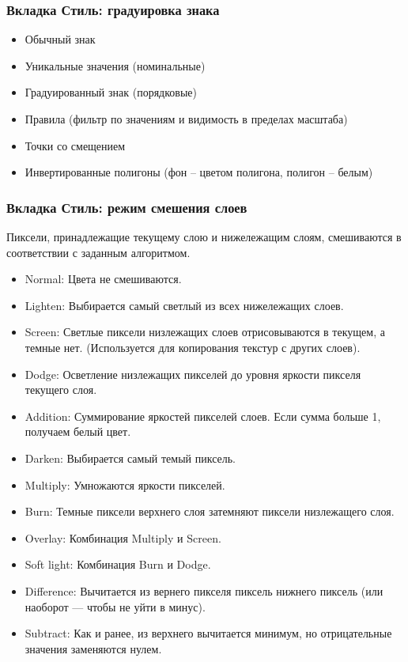 \begin{frame}[allowframebreaks]
    \frametitle{Вкладка Стиль: градуировка знака}
    \begin{itemize}
        \item Обычный знак
        \item Уникальные значения (номинальные)
        \item Градуированный знак (порядковые)
        \item Правила (фильтр по значениям и видимость в пределах масштаба)
        \item Точки со смещением
        \item Инвертированные полигоны (фон -- цветом полигона, полигон -- белым)
    \end{itemize}
\end{frame}

\begin{frame}[allowframebreaks]
    \frametitle{Вкладка Стиль: режим смешения слоев}
    Пиксели, принадлежащие текущему слою и нижележащим слоям, смешиваются в соответствии с заданным алгоритмом.
    \begin{itemize}
        \item Normal: Цвета не смешиваются.
        \item Lighten: Выбирается самый светлый из всех нижележащих слоев.
        \item Screen: Светлые пиксели низлежащих слоев отрисовываются в текущем, а темные нет. (Используется для копирования текстур с других слоев).
        \item Dodge: Осветление низлежащих пикселей до уровня яркости пикселя текущего слоя.
        \item Addition: Суммирование яркостей пикселей слоев. Если сумма больше 1, получаем белый цвет.
        \item Darken: Выбирается самый темый пиксель.
        \item Multiply: Умножаются яркости пикселей.
        \item Burn: Темные пиксели верхнего слоя затемняют пиксели низлежащего слоя.
        \item Overlay: Комбинация Multiply и Screen.
        \item Soft light: Комбинация Burn и Dodge.
        \item Difference: Вычитается из вернего пикселя пиксель нижнего пиксель (или наоборот --- чтобы не уйти в минус).
        \item Subtract: Как и ранее, из верхнего вычитается минимум, но отрицательные значения заменяются нулем.
    \end{itemize}
\end{frame}

